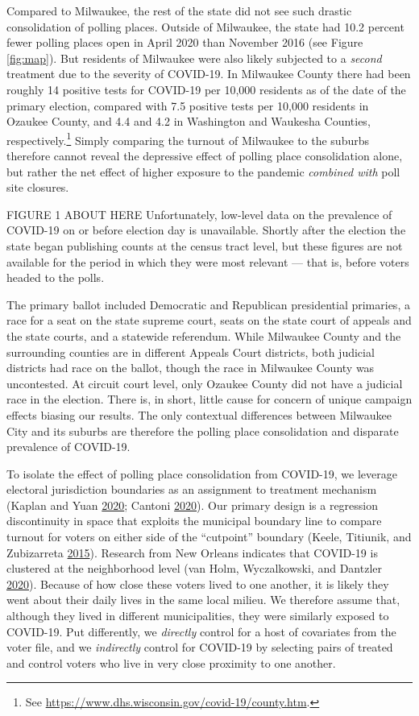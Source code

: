 \documentclass[
  12pt,
]{article}
\begin{document}
Compared to Milwaukee, the rest of the state did not see such drastic consolidation of polling places. Outside of Milwaukee, the state had 10.2 percent fewer polling places open in April 2020 than November 2016 (see Figure \ref{fig:map}). But residents of Milwaukee were also likely subjected to a \emph{second} treatment due to the severity of COVID-19. In Milwaukee County there had been roughly 14 positive tests for COVID-19 per 10,000 residents as of the date of the primary election, compared with 7.5 positive tests per 10,000 residents in Ozaukee County, and 4.4 and 4.2 in Washington and Waukesha Counties, respectively.\footnote{See \url{https://www.dhs.wisconsin.gov/covid-19/county.htm}.} Simply comparing the turnout of Milwaukee to the suburbs therefore cannot reveal the depressive effect of polling place consolidation alone, but rather the net effect of higher exposure to the pandemic \emph{combined with} poll site closures.

FIGURE 1 ABOUT HERE
Unfortunately, low-level data on the prevalence of COVID-19 on or before election day is unavailable. Shortly after the election the state began publishing counts at the census tract level, but these figures are not available for the period in which they were most relevant --- that is, before voters headed to the polls.

The primary ballot included Democratic and Republican presidential primaries, a race for a seat on the state supreme court, seats on the state court of appeals and the state courts, and a statewide referendum. While Milwaukee County and the surrounding counties are in different Appeals Court districts, both judicial districts had race on the ballot, though the race in Milwaukee County was uncontested. At circuit court level, only Ozaukee County did not have a judicial race in the election. There is, in short, little cause for concern of unique campaign effects biasing our results. The only contextual differences between Milwaukee City and its suburbs are therefore the polling place consolidation and disparate prevalence of COVID-19.

To isolate the effect of polling place consolidation from COVID-19, we leverage electoral jurisdiction boundaries as an assignment to treatment mechanism (Kaplan and Yuan \protect\hyperlink{ref-Kaplan2020}{2020}; Cantoni \protect\hyperlink{ref-Cantoni2020}{2020}). Our primary design is a regression discontinuity in space that exploits the municipal boundary line to compare turnout for voters on either side of the ``cutpoint'' boundary (Keele, Titiunik, and Zubizarreta \protect\hyperlink{ref-Keele2015}{2015}). Research from New Orleans indicates that COVID-19 is clustered at the neighborhood level (van Holm, Wyczalkowski, and Dantzler \protect\hyperlink{ref-vanHolm2020}{2020}). Because of how close these voters lived to one another, it is likely they went about their daily lives in the same local milieu. We therefore assume that, although they lived in different municipalities, they were similarly exposed to COVID-19. Put differently, we \emph{directly} control for a host of covariates from the voter file, and we \emph{indirectly} control for COVID-19 by selecting pairs of treated and control voters who live in very close proximity to one another.
\end{document}
